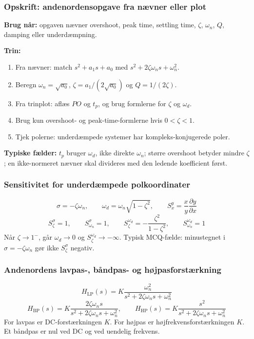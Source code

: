 \subsubsection{Opskrift: andenordensopgave fra nævner eller plot}
\textbf{Brug når:} opgaven nævner overshoot, peak time, settling time, \(\zeta\), \(\omega_n\), \(Q\), damping eller underdæmpning.

\textbf{Trin:}
\begin{enumerate}
    \item Fra nævner: match \(s^2+a_1s+a_0\) med \(s^2+2\zeta\omega_ns+\omega_n^2\).
    \item Beregn \(\omega_n=\sqrt{a_0}\), \(\zeta=a_1/(2\sqrt{a_0})\) og \(Q=1/(2\zeta)\).
    \item Fra trinplot: aflæs \(PO\) og \(t_p\), og brug formlerne for \(\zeta\) og \(\omega_d\).
    \item Brug kun overshoot- og peak-time-formlerne hvis \(0<\zeta<1\).
    \item Tjek polerne: underdæmpede systemer har kompleks-konjugerede poler.
\end{enumerate}

\textbf{Typiske fælder:} \(t_p\) bruger \(\omega_d\), ikke direkte \(\omega_n\); større overshoot betyder mindre \(\zeta\); en ikke-normeret nævner skal divideres med den ledende koefficient først.

\subsubsection{Sensitivitet for underdæmpede polkoordinater}
\[
\sigma=-\zeta\omega_n,\qquad \omega_d=\omega_n\sqrt{1-\zeta^2},\qquad
S_x^y=\frac{x}{y}\frac{\partial y}{\partial x}
\]
\[
S_{\zeta}^{\sigma}=1,\qquad S_{\omega_n}^{\sigma}=1,\qquad
S_{\zeta}^{\omega_d}=-\frac{\zeta^2}{1-\zeta^2},\qquad
S_{\omega_n}^{\omega_d}=1
\]
Når \(\zeta\to1^-\), går \(\omega_d\to0\) og \(S_{\zeta}^{\omega_d}\to-\infty\). Typisk MCQ-fælde: minustegnet i \(\sigma=-\zeta\omega_n\) gør ikke \(S_{\zeta}^{\sigma}\) negativ.

\subsubsection{Andenordens lavpas-, båndpas- og højpasforstærkning}
\[
H_{\mathrm{LP}}(s)=K\frac{\omega_n^2}{s^2+2\zeta\omega_n s+\omega_n^2}
\]
\[
H_{\mathrm{BP}}(s)=K\frac{2\zeta\omega_n s}{s^2+2\zeta\omega_n s+\omega_n^2},\qquad
H_{\mathrm{HP}}(s)=K\frac{s^2}{s^2+2\zeta\omega_n s+\omega_n^2}
\]
For lavpas er DC-forstærkningen \(K\). For højpas er højfrekvensforstærkningen \(K\). Et båndpas er nul ved DC og ved uendelig frekvens.
